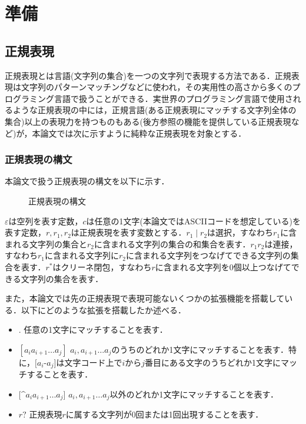 \documentclass[a4paper, 12pt, dvipdfmx, uplatex]{jsreport}
\begin{document}
\chapter{準備}
\section{正規表現}
正規表現とは言語(文字列の集合)を一つの文字列で表現する方法である．正規表現は文字列のパターンマッチングなどに使われ，その実用性の高さから多くのプログラミング言語で扱うことができる．実世界のプログラミング言語で使用されるような正規表現の中には，正規言語(ある正規表現にマッチする文字列全体の集合)以上の表現力を持つものもある(後方参照の機能を提供している正規表現など)が，本論文では次に示すように純粋な正規表現を対象とする．

\subsection{正規表現の構文}
本論文で扱う正規表現の構文を以下に示す．
\begin{figure}[h]
  \centering
  \setlength{\fboxrule}{0.5pt}
  \caption{正規表現の構文}
  \label{fig:syntax-regex}
\end{figure}

$\varepsilon$は空列を表す定数，$c$は任意の1文字(本論文ではASCIIコードを想定している)を表す定数，$r,r_1,r_2$は正規表現を表す変数とする．$r_1 \mid r_2$は選択，すなわち$r_1$に含まれる文字列の集合と$r_2$に含まれる文字列の集合の和集合を表す．$r_1r_2$は連接，すなわち$r_1$に含まれる文字列に$r_2$に含まれる文字列をつなげてできる文字列の集合を表す．$r^*$はクリーネ閉包，すなわち$r$に含まれる文字列を0個以上つなげてできる文字列の集合を表す．

また，本論文では先の正規表現で表現可能ないくつかの拡張機能を搭載している．以下にどのような拡張を搭載したか述べる．
\begin{itemize}
  \item $.$ \quad 任意の1文字にマッチすることを表す．
  \item $[a_ia_{i+1}\ldots a_j]$ \quad $a_i,a_{i+1}\ldots a_j$のうちのどれか1文字にマッチすることを表す．特に，$[a_i$-$a_j]$は文字コード上で$i$から$j$番目にある文字のうちどれか1文字にマッチすることを表す．
  \item $[$^$a_ia_{i+1}\ldots a_j]$ \quad $a_i,a_{i+1}\ldots a_j$以外のどれか1文字にマッチすることを表す．
  \item $r?$ \quad 正規表現$r$に属する文字列が0回または1回出現することを表す．
\end{itemize}
\end{document}
